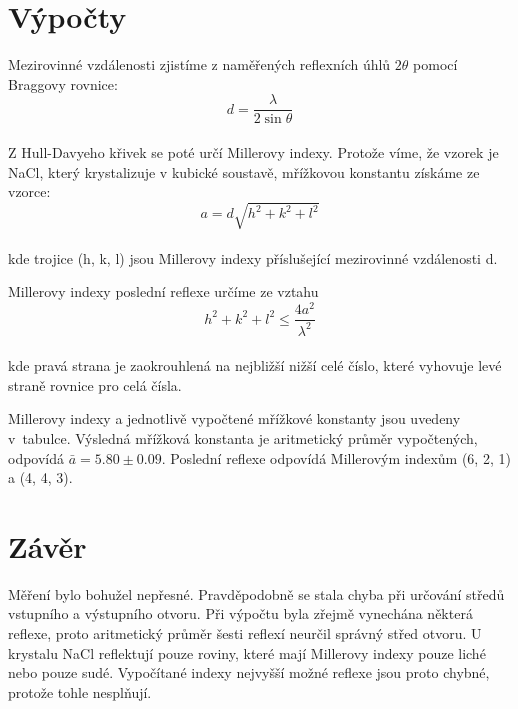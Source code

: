 \documentclass[11pt]{article}
\begin{document}
\section{Výpočty}
Mezirovinné vzdálenosti zjistíme z naměřených reflexních úhlů $2\theta$
pomocí Braggovy rovnice:
$$d = \frac{\lambda}{2 \sin \theta}$$ \\

Z Hull-Davyeho křivek se poté určí Millerovy indexy.  Protože víme, že vzorek
je NaCl, který krystalizuje v kubické soustavě, mřížkovou konstantu získáme ze
vzorce:
$$a = d \sqrt{h^2 + k^2 + l^2}$$ \\
kde trojice (h, k, l) jsou Millerovy indexy příslušející mezirovinné
vzdálenosti d.

Millerovy indexy poslední reflexe určíme ze vztahu
$$h^2 + k^2 + l^2 \le \frac{4 a^2}{\lambda^2}$$\\
kde pravá strana je zaokrouhlená na nejbližší nižší celé číslo, které
vyhovuje levé straně rovnice pro celá čísla.

Millerovy indexy a jednotlivě vypočtené mřížkové konstanty jsou uvedeny
v~tabulce. Výsledná mřížková konstanta je aritmetický průměr vypočtených,
odpovídá $\bar{a} = 5.80 \pm 0.09$. Poslední reflexe odpovídá Millerovým indexům
(6, 2, 1) a (4, 4, 3).
\section{Závěr} 
Měření bylo bohužel nepřesné. Pravděpodobně se stala chyba při určování středů
vstupního a výstupního otvoru. Při výpočtu byla zřejmě vynechána některá
reflexe, proto aritmetický průměr šesti reflexí neurčil správný střed otvoru.
U krystalu NaCl reflektují pouze roviny, které mají Millerovy indexy pouze liché nebo pouze sudé. Vypočítané indexy nejvyšší možné reflexe jsou proto chybné, protože tohle nesplňují.
\end{document}
